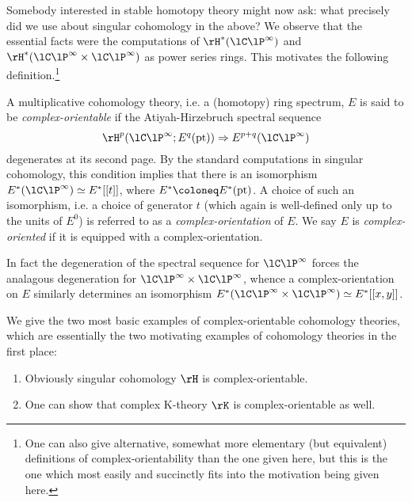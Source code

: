 Somebody interested in stable homotopy theory might now ask: what
precisely did we use about singular cohomology in the above? We
observe that the essential facts were the computations of
$\rH^*(\CP^\infty)$ and $\rH^*(\CP^\infty \times \CP^\infty)$ as power
series rings. This motivates the following definition.\footnote{One
  can also give alternative, somewhat more elementary (but equivalent)
  definitions of complex-orientability than the one given here, but
  this is the one which most easily and succinctly fits into the
  motivation being given here.}

\begin{definition}
  \label{chrom-complor}
  A multiplicative cohomology theory, i.e. a (homotopy) ring spectrum,
  $E$ is said to be \emph{complex-orientable} if the Atiyah-Hirzebruch
  spectral sequence
  \[
  \rH^p(\CP^\infty;E^q(\pt)) \Rightarrow E^{p+q}(\CP^\infty)
  \]
  degenerates at its second page. By the standard computations in
  singular cohomology, this condition implies that there is an
  isomorphism $E^*(\CP^\infty) \iso E^*[[t]]$, where
  $E^* \ce E^*(\pt)$. A choice of such an isomorphism, i.e. a choice
  of generator $t$ (which again is well-defined only up to the units
  of $E^0$) is referred to as a \emph{complex-orientation} of $E$. We
  say $E$ is \emph{complex-oriented} if it is equipped with a
  complex-orientation.

  In fact the degeneration of the spectral sequence for $\CP^\infty$
  forces the analagous degeneration for
  $\CP^\infty \times \CP^\infty$, whence a complex-orientation on $E$
  similarly determines an isomorphism
  $E^*(\CP^\infty \times \CP^\infty) \iso E^*[[x,y]]$.
\end{definition}

\begin{examples}
  \label{chrom-coex}
  We give the two most basic examples of complex-orientable cohomology
  theories, which are essentially the two motivating examples of
  cohomology theories in the first place:
  \begin{enumerate}
  \item Obviously singular cohomology $\rH$ is complex-orientable.
  \item One can show that complex K-theory $\rK$ is complex-orientable
    as well.
  \end{enumerate}
\end{examples}

